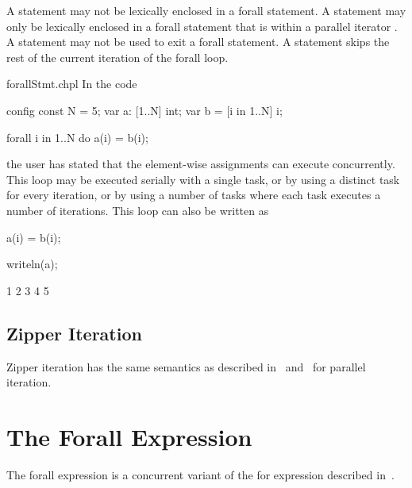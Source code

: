 A  statement may not be lexically enclosed in a forall
statement. A  statement may only be lexically enclosed in
a forall statement that is within a parallel iterator
.
A  statement may not be used to exit a forall statement.
A  statement skips the rest of the current iteration
of the forall loop.

\begin{chapelexample}{forallStmt.chpl}
In the code
\begin{chapelpre}
config const N = 5;
var a: [1..N] int;
var b = [i in 1..N] i;
\end{chapelpre}
\begin{chapel}
forall i in 1..N do
  a(i) = b(i);
\end{chapel}
the user has stated that the element-wise assignments can execute
concurrently.  This loop may be executed serially with a single task,
or by using a distinct task for every iteration, or by using a number
of tasks where each task executes a number of iterations.  This loop
can also be written as
\begin{chapel}
[i in 1..N] a(i) = b(i);
\end{chapel}
\begin{chapelpost}
writeln(a);
\end{chapelpost}
\begin{chapeloutput}
1 2 3 4 5
\end{chapeloutput}
\end{chapelexample}

\subsection{Zipper Iteration}
\label{forall_zipper}

Zipper iteration has the same semantics as described
in~ and~ for parallel
iteration.

\pagebreak
\section{The Forall Expression}
\label{Forall_Expressions}

The forall expression is a concurrent variant of the for expression
described in~.

